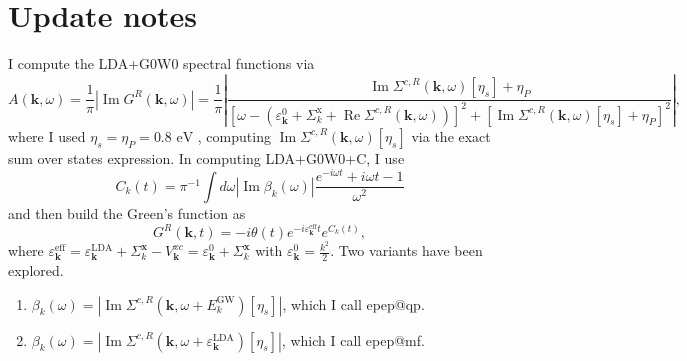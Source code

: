 \section{Update notes}
 I compute the LDA+G0W0 spectral functions via
\begin{equation}
    A(\mathbf{k}, \omega) = \frac{1}{\pi}|\operatorname{Im}G^R(\mathbf{k}, \omega)| =
\frac{1}{\pi} |\frac{ \operatorname{Im} \Sigma^{c,R}(\mathbf{k}, \omega)[\eta_s]+\eta_P}{\left[\omega - \left(\varepsilon_{\mathbf{k}}^0+\Sigma_k^{\mathrm{x}}+ \operatorname{Re} \Sigma^{c,R}(\mathbf{k}, \omega)\right)\right]^2 + \left[\operatorname{Im} \Sigma^{c,R}(\mathbf{k}, \omega)[\eta_s]+\eta_P\right]^2}|,
\end{equation}
where I used $\eta_s=\eta_P=0.8 \text{ eV }$, computing $\operatorname{Im} \Sigma^{c,R}(\mathbf{k}, \omega)[\eta_s]$ via the exact sum over states expression. In computing LDA+G0W0+C, I use
\begin{equation}
    C_k(t) = \pi^{-1} \int d \omega\left|\operatorname{Im} \beta_k(\omega)\right|\frac{e^{-i \omega t}+i \omega t-1}{\omega^2}
\end{equation}
and then build the Green's function as 
\begin{equation}
    G^R(\mathbf{k}, t) = -i \theta(t) e^{-i \varepsilon_{\mathbf{k}}^{\text{eff}} t} e^{C_k(t)},
\end{equation}
where $\varepsilon_{\mathbf{k}}^{\text{eff}}=\varepsilon_{\mathbf{k}}^{\text{LDA}}+\Sigma_k^{\mathbf{x}}-V^{xc}_{\mathbf{k}}=\varepsilon^0_{\mathbf{k}}+\Sigma_k^{\mathbf{x}}$ with $\varepsilon^0_{\mathbf{k}}=\frac{k^2}{2}$. Two variants have been explored. 
\begin{enumerate}
    \item $\beta_k(\omega)= \left|\operatorname{Im} \Sigma^{c,R}(\mathbf{k}, \omega+E^{\text{GW}}_k)[\eta_s]\right|$, which I call epep@qp.
    \item $\beta_k(\omega)= \left|\operatorname{Im} \Sigma^{c,R}(\mathbf{k}, \omega+\varepsilon_{\mathbf{k}}^{\text{LDA}})[\eta_s]\right|$, which I call epep@mf.
\end{enumerate}
